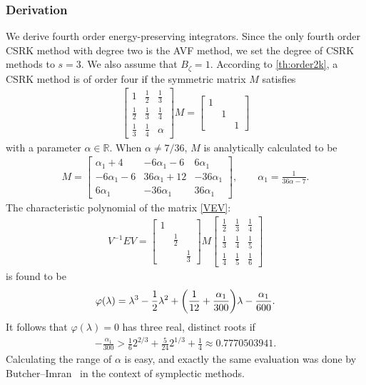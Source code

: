 \documentclass[final,leqno,onefignum,onetabnum]{siamltex1213}
\DeclarePairedDelimiter\paren{\lparen}{\rparen}
\begin{document}
\subsubsection{Derivation}
We derive fourth order energy-preserving integrators.
Since the only fourth order CSRK method with degree two
is the AVF method,
we set the degree of CSRK methods to $s=3$.
We also assume that $B_\zeta = 1$.
According to \autoref{th:order2k}, 
a CSRK method is of order four
if the symmetric matrix $M$ satisfies
\begin{align}
\begin{bmatrix}
1 & \frac{1}{2} & \frac{1}{3} \\
\frac{1}{2} & \frac{1}{3} & \frac{1}{4} \\
\frac{1}{3} & \frac{1}{4} & \alpha
\end{bmatrix}
M =
\begin{bmatrix}
1 & & \\ & 1 & \\ & & 1
\end{bmatrix}
\end{align}
with a parameter $\alpha \in {\mathbb R}$.
When $\alpha \neq 7/36$, $M$ is analytically calculated to be
\begin{align*}
M = \begin{bmatrix}
\alpha_1 + 4 & -6 \alpha_1 - 6 & 6\alpha_1\\
-6 \alpha_1 - 6 & 36\alpha_1+12 & -36\alpha_1 \\
6\alpha_1  &  -36 \alpha_1 & 36\alpha_1
\end{bmatrix},\qquad
\alpha_1 = \frac{1}{36\alpha -7}.
\end{align*}
The characteristic polynomial of the matrix \eqref{VEV}:
\begin{align*}
V^{-1}EV = \begin{bmatrix}
1 & & \\ & \frac12 & \\ & & \frac13
\end{bmatrix}
M
\begin{bmatrix}
\frac12 & \frac13 & \frac14 \\
\frac13 & \frac14 & \frac15 \\
\frac14 & \frac15 & \frac16 
\end{bmatrix}
\end{align*}
is found to be
\begin{align*}
\varphi (\lambda )= \lambda^3 - \frac{1}{2}\lambda^2 + \paren*{\frac{1}{12}+\frac{\alpha_1}{300}}
\lambda - \frac{\alpha_1}{600}.
\end{align*}
It follows that $\varphi (\lambda )=0$ has three real, distinct roots
if
\begin{align*}
-\frac{\alpha_1}{300} > \frac{1}{6}2^{2/3} + \frac{5}{24}2^{1/3} + \frac{1}{4}
\approx
0.7770503941.
\end{align*}
Calculating the range of $\alpha$ is easy, and 
exactly the same evaluation was done by Butcher--Imran~\cite{bu13}
in the context of symplectic methods.
\end{document}
